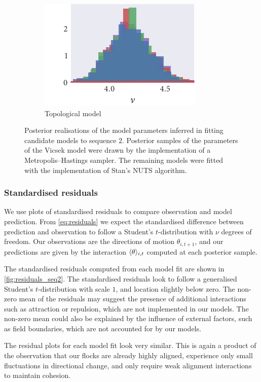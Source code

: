 \begin{figure}[p]
\begin{subfigure}[b]{\textwidth}
    \includegraphics{seq2/top_hist_nu.pdf}%
    \caption{Topological model}
  \end{subfigure}
  \vspace{-2em}
  \caption{Posterior realisations of the model parameters inferred in fitting
  candidate models to sequence $2$. Posterior samples of the parameters of the
  Vicsek model were drawn by the implementation of a Metropolis--Hastings
  sampler. The remaining models were fitted with the implementation of Stan's
  NUTS algorithm.}
  \label{fig:posteriors_seq2}
\end{figure}

\subsubsection{Standardised residuals}

We use plots of standardised residuals to compare observation and model
prediction. From \cref{eq:residuals} we expect the standardised difference
between prediction and observation to follow a Student's $t$-distribution with
$\nu$ degrees of freedom. Our observations are the directions of motion
$\theta_{i,t+1}$, and our predictions are given by the interaction
$\langle\theta\rangle_{i,t}$ computed at each posterior sample.

The standardised residuals computed from each model fit are shown in
\cref{fig:residuals_seq2}. The standardised residuals look to follow a
generalised Student's $t$-distribution with scale $1$, and location slightly
below zero. The non-zero mean of the residuals may suggest the presence of
additional interactions such as attraction or repulsion, which are not
implemented in our models. The non-zero mean could also be explained by the
influence of external factors, such as field boundaries, which are not
accounted for by our models.

The residual plots for each model fit look very similar. This is again a
product of the observation that our flocks are already highly aligned,
experience only small fluctuations in directional change, and only require weak
alignment interactions to maintain cohesion.

